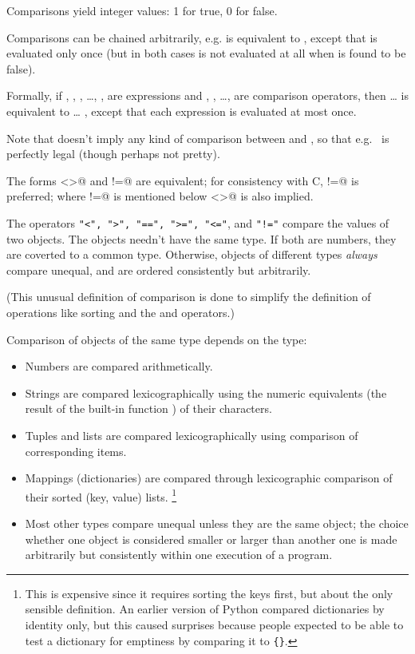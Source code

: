 Comparisons yield integer values: 1 for true, 0 for false.

Comparisons can be chained arbitrarily, e.g.  is
equivalent to , except that  is
evaluated only once (but in both cases  is not evaluated at all
when  is found to be false).

Formally, if , , , \ldots, ,  are
expressions and , , \ldots,  are comparison
operators, then  \ldots {} is equivalent
to     \ldots {}
, except that each expression is evaluated at most once.

Note that  doesn't imply any kind of comparison
between  and , so that e.g.\  is
perfectly legal (though perhaps not pretty).

The forms \verb@<>@ and \verb@!=@ are equivalent; for consistency with
C, \verb@!=@ is preferred; where \verb@!=@ is mentioned below
\verb@<>@ is also implied.

The operators {\tt "<", ">", "==", ">=", "<="}, and {\tt "!="} compare
the values of two objects.  The objects needn't have the same type.
If both are numbers, they are coverted to a common type.  Otherwise,
objects of different types {\em always} compare unequal, and are
ordered consistently but arbitrarily.

(This unusual definition of comparison is done to simplify the
definition of operations like sorting and the \verb@in@ and
\verb@not@ \verb@in@ operators.)

Comparison of objects of the same type depends on the type:

\begin{itemize}

\item
Numbers are compared arithmetically.

\item
Strings are compared lexicographically using the numeric equivalents
(the result of the built-in function \verb@ord@) of their characters.

\item
Tuples and lists are compared lexicographically using comparison of
corresponding items.

\item
Mappings (dictionaries) are compared through lexicographic
comparison of their sorted (key, value) lists.%
\footnote{This is expensive since it requires sorting the keys first,
but about the only sensible definition.  An earlier version of Python
compared dictionaries by identity only, but this caused surprises
because people expected to be able to test a dictionary for emptiness
by comparing it to {\tt \{\}}.}

\item
Most other types compare unequal unless they are the same object;
the choice whether one object is considered smaller or larger than
another one is made arbitrarily but consistently within one
execution of a program.

\end{itemize}

